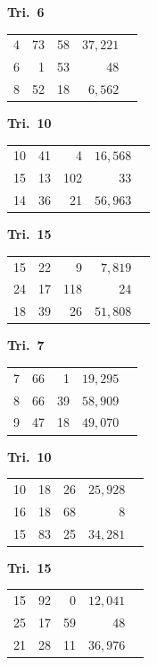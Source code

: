 \documentclass[12pt,a4paper]{article}
\theoremstyle{plain}
\theoremstyle{definition}
\theoremstyle{remark}
\begin{document}
\begin{center}
\medskip
\noindent
\begin{minipage}[t]{0.32\textwidth}
\centering
\textbf{Tri.~6}
\begin{tabular}[t]{r|r|r|r|l}
  4 & 73 & 58 & $37{,}221$ \\
  6 & 1 & 53 & 48 \\
  8 & 52 & 18 & $6{,}562$ \\
\end{tabular}
\end{minipage}\hfill
\begin{minipage}[t]{0.32\textwidth}
\centering
\textbf{Tri.~10}
\begin{tabular}[t]{r|r|r|r|l}
  10 & 41 & 4 & $16{,}568$ \\
  15 & 13 & 102 & 33 \\
  14 & 36 & 21 & $56{,}963$ \\
\end{tabular}
\end{minipage}\hfill
\begin{minipage}[t]{0.32\textwidth}
\centering
\textbf{Tri.~15}
\begin{tabular}[t]{r|r|r|r|l}
  15 & 22 & 9 & $7{,}819$ \\
  24 & 17 & 118 & 24 \\
  18 & 39 & 26 & $51{,}808$ \\
\end{tabular}
\end{minipage}

\medskip
\noindent
\begin{minipage}[t]{0.32\textwidth}
\centering
\textbf{Tri.~7}
\begin{tabular}[t]{r|r|r|r|l}
  7 & 66 & 1 & $19{,}295$ \\
  8 & 66 & 39 & $58{,}909$ \\
  9 & 47 & 18 & $49{,}070$ \\
\end{tabular}
\end{minipage}\hfill
\begin{minipage}[t]{0.32\textwidth}
\centering
\textbf{Tri.~10}
\begin{tabular}[t]{r|r|r|r|l}
  10 & 18 & 26 & $25{,}928$ \\
  16 & 18 & 68 & 8 \\
  15 & 83 & 25 & $34{,}281$ \\
\end{tabular}
\end{minipage}\hfill
\begin{minipage}[t]{0.32\textwidth}
\centering
\textbf{Tri.~15}
\begin{tabular}[t]{r|r|r|r|l}
  15 & 92 & 0 & $12{,}041$ \\
  25 & 17 & 59 & 48 \\
  21 & 28 & 11 & $36{,}976$ \\
\end{tabular}
\end{minipage}


\end{center}
\end{document}
